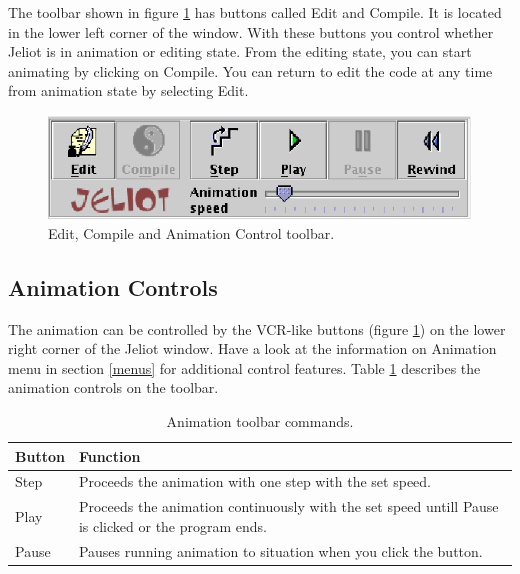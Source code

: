\documentclass[a4paper,11pt,english]{article}
\newcommand{\jel}{Jeliot}
\newcommand{\bu}[1]{\textsf{#1}}
\newcommand{\menu}{\bu}
\begin{document}
{The toolbar shown in figure \ref{fig:animation_control} has buttons called \bu{Edit} and \bu{Compile}. It is located in the lower left corner of the window. With these buttons you control whether \jel{} is in animation or editing state. From the editing state, you can start animating by clicking on \bu{Compile}. You can return to edit the code at any time from animation state by selecting \bu{Edit}.

\begin{figure}[ht]
\begin{center}
\includegraphics{images/animation_controls.eps}
\caption{\label{fig:animation_control}Edit, Compile and Animation Control toolbar.}
\end{center}
\end{figure}

\subsection{Animation Controls}
\label{animation_controls}
The animation can be controlled by the VCR-like buttons (figure \ref{fig:animation_control}) on the lower right corner of the \jel{} window. Have a look at the information on \menu{Animation} menu in section \ref{menus} for additional control features. Table \ref{tbl:commands} describes the animation controls on the toolbar.

\begin{table}[h]
\begin{center}
\caption{\label{tbl:commands}Animation toolbar commands.}

\begin{tabular}{l|p{100mm}}
\hline
\textbf{Button} & \textbf{Function} \\
\hline
\bu{Step} & Proceeds the animation with one step with the set speed. \\

\bu{Play} & Proceeds the animation continuously with the set speed untill \bu{Pause} is clicked or the program ends.\\

\bu{Pause} & Pauses running animation to situation when you click the button. \\


\end{tabular}
\end{center}
\end{table}}
\end{document}
